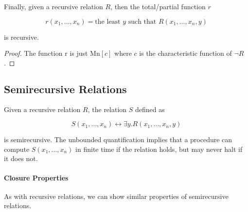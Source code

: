 Finally, given a recursive relation $R$, then the total/partial function $r$

$$r(x_1, \ldots, x_n) = \textrm{the least } y \textrm{ such that } R(x_1,
\ldots, x_n, y)$$

is recursive.

\begin{proof}
The function r is just $\mathrm{Mn}[c]$ where $c$ is the characteristic function
of $\neg R$.
\end{proof}

\subsection{Semirecursive Relations}

Given a recursive relation $R$, the relation $S$ defined as

$$S(x_1, \ldots, x_n) \leftrightarrow \exists y. R(x_1, \ldots, x_n, y)$$

is semirecursive. The unbounded quantification implies that a procedure can
compute $S(x_1, \ldots, x_n)$ in finite time if the relation holds, but may
never halt if it does not.

\paragraph{Closure Properties}

As with recursive relations, we can show similar properties of semirecursive
relations.


